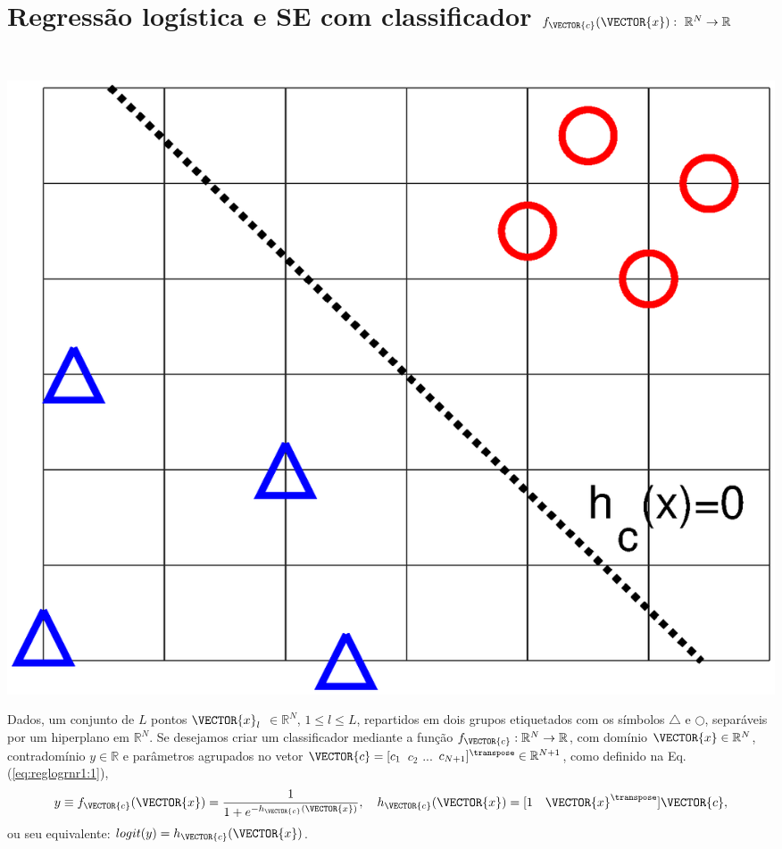 \newpage

\section{Regressão logística e SE com classificador $f_{\VECTOR{c}}(\VECTOR{x}):~\mathbb{R}^{N} \rightarrow \mathbb{R}$}
\label{sec:theo:reglogrnr1:1}




\begin{theorem}\label{theo:reglogrnr1:1}
~\\
\noindent
\begin{minipage}{0.45\textwidth}
\centering
\includegraphics[width=0.95\linewidth]{chapters/classificacao/mfiles/reglogrnr1/reglogrnr1.eps} 
\end{minipage}
\begin{minipage}{0.55\textwidth}
Dados, um conjunto de $L$ pontos
$\VECTOR{x}_l$ $\in \mathbb{R}^{N}$, $1\leq l \leq L$,
repartidos em dois grupos etiquetados com os símbolos $\bigtriangleup$ e $\bigcirc$,
separáveis por um hiperplano  em $\mathbb{R}^{N}$.
Se desejamos criar um classificador mediante 
a função  $f_{\VECTOR{c}}:\mathbb{R}^{N} \rightarrow \mathbb{R}$,
com domínio $\VECTOR{x} \in \mathbb{R}^{N}$, contradomínio $y \in \mathbb{R}$ e 
parâmetros agrupados no vetor $\VECTOR{c}=[c_1$ $c_2$ $...$ $c_{N+1}]^{\transpose}\in \mathbb{R}^{N+1}$,
como definido na Eq. (\ref{eq:reglogrnr1:1}),
\begin{equation}\label{eq:reglogrnr1:1}
y\equiv f_{\VECTOR{c}}(\VECTOR{x})= \frac{1}{1+e^{-h_{\VECTOR{c}}(\VECTOR{x})}},
\quad h_{\VECTOR{c}}(\VECTOR{x})=[1\quad \VECTOR{x}^{\transpose}] \VECTOR{c},
\end{equation}
ou seu equivalente: $logit(y)=h_{\VECTOR{c}}(\VECTOR{x})$.
\end{minipage}


\end{theorem}
